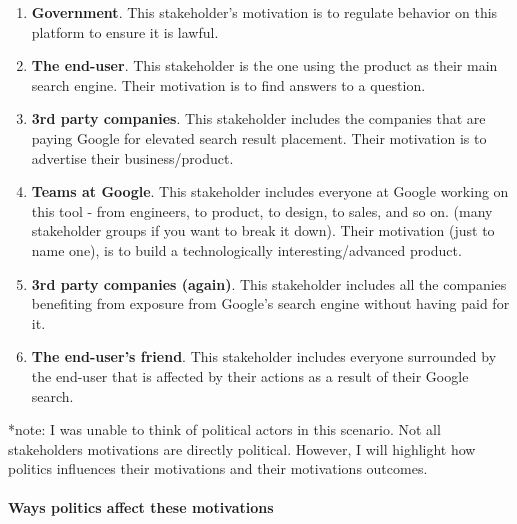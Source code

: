 \begin{enumerate}
\item
  \textbf{Government}. This stakeholder's motivation is to regulate behavior on this platform to ensure it is lawful.
\item
  \textbf{The end-user}. This stakeholder is the one using the product as their main search engine. Their motivation is to find answers to a question.
\item
  \textbf{3rd party companies}. This stakeholder includes the companies that are paying Google for elevated search result placement. Their motivation is to advertise their business/product.
\item
  \textbf{Teams at Google}. This stakeholder includes everyone at Google working on this tool - from engineers, to product, to design, to sales, and so on. (many stakeholder groups if you want to break it down). Their motivation (just to name one), is to build a technologically interesting/advanced product.
\item
  \textbf{3rd party companies (again)}. This stakeholder includes all the companies benefiting from exposure from Google's search engine without having paid for it.
\item
  \textbf{The end-user's friend}. This stakeholder includes everyone surrounded by the end-user that is affected by their actions as a result of their Google search.
\end{enumerate}

*note: I was unable to think of political actors in this scenario. Not all stakeholders motivations are directly political. However, I will highlight how politics influences their motivations and their motivations outcomes.

\paragraph{Ways politics affect these motivations}

